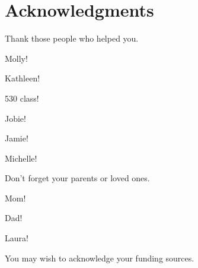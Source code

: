 
\chapter{Acknowledgments}

Thank those people who helped you. 

Molly!

Kathleen!

530 class!

Jobie!

Jamie!

Michelle!

Don't forget your parents or loved ones.

Mom!

Dad!

Laura!

You may wish to acknowledge your funding sources.
